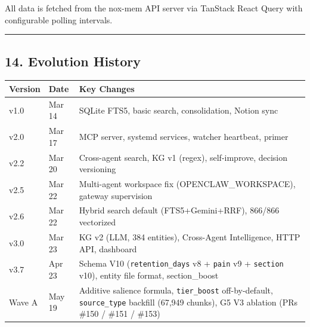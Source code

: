 \documentclass[
]{article}
\newcounter{none} %
\begin{document}
All data is fetched from the nox-mem API server via TanStack React Query
with configurable polling intervals.

\begin{center}\rule{0.5\linewidth}{0.5pt}\end{center}

\subsection{14. Evolution History}\label{evolution-history}

{\def\LTcaptype{none} %
\begin{longtable}[]{@{}
  >{\raggedright\arraybackslash}p{}
  >{\raggedright\arraybackslash}p{}
  >{\raggedright\arraybackslash}p{}@{}}
\toprule\noalign{}
\begin{minipage}[b]{\linewidth}\raggedright
Version
\end{minipage} & \begin{minipage}[b]{\linewidth}\raggedright
Date
\end{minipage} & \begin{minipage}[b]{\linewidth}\raggedright
Key Changes
\end{minipage} \\
\midrule\noalign{}
\endhead
\bottomrule\noalign{}
\endlastfoot
v1.0 & Mar 14 & SQLite FTS5, basic search, consolidation, Notion sync \\
v2.0 & Mar 17 & MCP server, systemd services, watcher heartbeat,
primer \\
v2.2 & Mar 20 & Cross-agent search, KG v1 (regex), self-improve,
decision versioning \\
v2.5 & Mar 22 & Multi-agent workspace fix (OPENCLAW\_WORKSPACE), gateway
supervision \\
v2.6 & Mar 22 & Hybrid search default (FTS5+Gemini+RRF), 866/866
vectorized \\
v3.0 & Mar 23 & KG v2 (LLM, 384 entities), Cross-Agent Intelligence,
HTTP API, dashboard \\
v3.7 & Apr 23 & Schema V10 (\texttt{retention\_days} v8 + \texttt{pain}
v9 + \texttt{section} v10), entity file format, section\_boost \\
Wave A & May 19 & Additive salience formula, \texttt{tier\_boost}
off-by-default, \texttt{source\_type} backfill (67,949 chunks), G5 V3
ablation (PRs \#150 / \#151 / \#153) \\

\end{longtable}}
\end{document}
